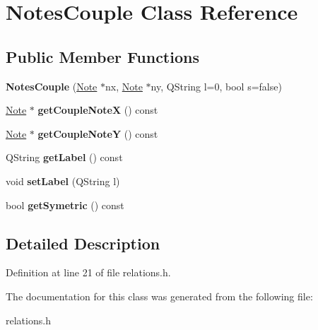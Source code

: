 \hypertarget{class_notes_couple}{}\section{Notes\+Couple Class Reference}
\label{class_notes_couple}
\subsection*{Public Member Functions}
\begin{DoxyCompactItemize}
\item 
\mbox{\label{class_notes_couple_ac9bb6dd9ba7376af7030f3b64a24ae88}} 
{\bfseries Notes\+Couple} (\hyperlink{class_note}{Note} $\ast$nx, \hyperlink{class_note}{Note} $\ast$ny, Q\+String l=0, bool s=false)
\item 
\mbox{\label{class_notes_couple_a1769af8ac96f94717f9b59011ee3cab1}} 
\hyperlink{class_note}{Note} $\ast$ {\bfseries get\+Couple\+NoteX} () const
\item 
\mbox{\label{class_notes_couple_ab56dc53d43664f370a8d2af58c9d4b90}} 
\hyperlink{class_note}{Note} $\ast$ {\bfseries get\+Couple\+NoteY} () const
\item 
\mbox{\label{class_notes_couple_ac163d6cd5d3f17f7b74ec353e8feffb9}} 
Q\+String {\bfseries get\+Label} () const
\item 
\mbox{\label{class_notes_couple_a12fd471a0510e598869592460377258f}} 
void {\bfseries set\+Label} (Q\+String l)
\item 
\mbox{\label{class_notes_couple_addb870bdbfdd5586f214c908122e597d}} 
bool {\bfseries get\+Symetric} () const
\end{DoxyCompactItemize}


\subsection{Detailed Description}


Definition at line 21 of file relations.\+h.



The documentation for this class was generated from the following file\+:\begin{DoxyCompactItemize}
\item 
relations.\+h\end{DoxyCompactItemize}
